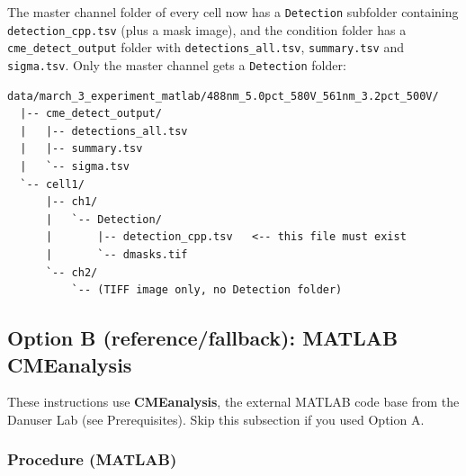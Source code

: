 \documentclass[11pt]{article}
\newcommand{\code}[1]{\texttt{#1}}
\begin{document}
\begin{sloppypar}
The master channel folder of every cell now has a \code{Detection}
subfolder containing \code{detection\_cpp.tsv} (plus a mask image),
and the condition folder has a \code{cme\_detect\_output} folder with
\code{detections\_all.tsv}, \code{summary.tsv} and \code{sigma.tsv}.
Only the master channel gets a \code{Detection} folder:
\end{sloppypar}

\begin{lstlisting}
data/march_3_experiment_matlab/488nm_5.0pct_580V_561nm_3.2pct_500V/
  |-- cme_detect_output/
  |   |-- detections_all.tsv
  |   |-- summary.tsv
  |   `-- sigma.tsv
  `-- cell1/
      |-- ch1/
      |   `-- Detection/
      |       |-- detection_cpp.tsv   <-- this file must exist
      |       `-- dmasks.tif
      `-- ch2/
          `-- (TIFF image only, no Detection folder)
\end{lstlisting}

\subsection*{Option B (reference/fallback): MATLAB CMEanalysis}

These instructions use \textbf{CMEanalysis}, the external MATLAB code
base from the Danuser Lab (see Prerequisites). Skip this subsection if
you used Option A.

\subsubsection*{Procedure (MATLAB)}
\end{document}
